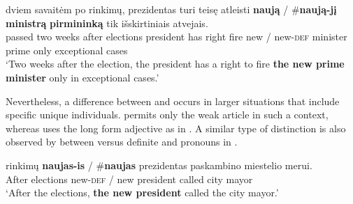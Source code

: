 \documentclass[output=paper,
modfonts
]{langscibook}
\begin{document}
\begin{exe}
\ex\label{ex:sereikaite:3}
 {dviem} {savaitėm} {po} {rinkimų}, {prezidentas} {turi} {teisę} {atleisti} \textbf{naują} \textnormal{/} \textnormal{\#}\textbf{naują-jį} \textbf{ministrą} \textbf{{pirmininką}} {tik} {išskirtiniais} {atvejais}.\\
passed two weeks after elections president has right fire new / \phantom{\#}new-\textsc{def} {minister} {prime} only exceptional cases\\
\trans `Two weeks after the election, the president has a right to fire \textbf{the new prime minister} only in exceptional cases.' 
\end{exe}

Nevertheless, a difference between  and  occurs in larger situations that include specific unique individuals.  permits only the weak article in such a context, whereas  uses the long form adjective as in . A similar type of distinction is also observed by \citet{Jenks2015} between  versus definite  and pronouns in .

\begin{exe} 
\ex \label{ex:sereikaite:4} 
 {rinkimų} \textbf{naujas-is} \textnormal{/} \textnormal{\#}\textbf{naujas} {prezidentas} {paskambino} {miestelio} {merui}.\\
After elections \phantom{\#}new-\textsc{def} / {new} president called city mayor\\
\trans `After the elections, \textbf{the new president} called the city mayor.' 
\end{exe}
\end{document}
